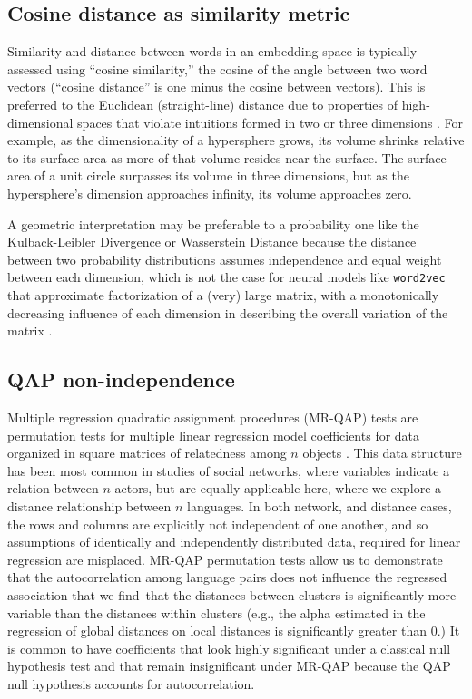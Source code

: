 \documentclass[9pt,twocolumn,twoside,lineno]{pnas-new}
\begin{document}
{%
\subsection*{Cosine distance as similarity metric}
Similarity and distance between words in an embedding space is typically assessed using ``cosine similarity,'' the cosine of the angle between two word vectors (``cosine distance'' is one minus the cosine between vectors). This is preferred to the Euclidean (straight-line) distance due to properties of high-dimensional spaces that violate intuitions formed in two or three dimensions \cite{kozlowski2019geometry}. For example, as the dimensionality of a hypersphere grows, its volume shrinks relative to its surface area as more of that volume resides near the surface. The surface area of a unit circle surpasses its volume in three dimensions, but as the hypersphere’s dimension approaches infinity, its volume approaches zero. %

A geometric interpretation may be preferable to a probability one like the Kulback-Leibler Divergence or Wasserstein Distance because the distance between two probability distributions assumes independence and equal weight between each dimension, which is not the case for neural models like \texttt{word2vec} that approximate factorization of a (very) large matrix, with a monotonically decreasing influence of each dimension in describing the overall variation of the matrix \cite{levy2014neural}. 

\subsection*{QAP non-independence}
Multiple regression quadratic assignment procedures (MR-QAP) tests are permutation tests for multiple linear regression model coefficients for data organized in square matrices of relatedness among $n$ objects \cite{dekker2007sensitivity}. This data structure has been most common in studies of social networks, where variables indicate a relation between $n$ actors, but are equally applicable here, where we explore a distance relationship between $n$ languages. In both network, and distance cases, the rows and columns are explicitly not independent of one another, and so assumptions of identically and independently distributed data, required for linear regression are misplaced. MR-QAP permutation tests allow us to demonstrate that the autocorrelation among language pairs does not influence the regressed association that we find--that the distances between clusters is significantly more variable than the distances within clusters (e.g., the alpha estimated in the regression of global distances on local distances is significantly greater than 0.) It is common to have coefficients that look highly significant under a classical null hypothesis test and that remain insignificant under MR-QAP because the QAP null hypothesis accounts for autocorrelation. 

}
\end{document}
